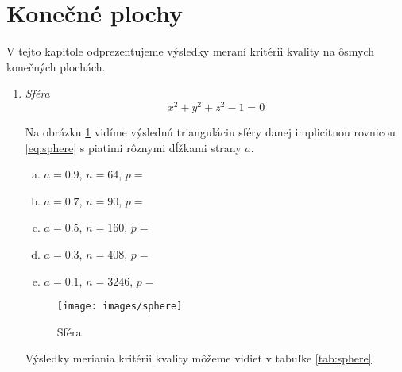 \section{Konečné plochy}

V tejto kapitole odprezentujeme výsledky meraní kritérii kvality na ôsmych konečných plochách.

\newpage

\begin{enumerate}
\item{
    \textit{Sféra}
    \begin{equation}
    \label{eq:sphere}
    x^2 + y^2 + z^2 - 1 = 0
    \end{equation}

    Na obrázku \ref{obr:sphere} vidíme výslednú trianguláciu sféry danej implicitnou 
    rovnicou \ref{eq:sphere} s piatimi rôznymi dĺžkami strany $a$.
    \begin{enumerate}[a)]
    \item{
        $a=0.9$, $n=64$, $p=$
    }
    \item{
        $a=0.7$, $n=90$, $p=$
    }
    \item{
        $a=0.5$, $n=160$, $p=$
    }
    \item{
        $a=0.3$, $n=408$, $p=$
    }
    \item{
        $a=0.1$, $n=3246$, $p=$
    }
    \end{enumerate}

    \begin{figure}
        \centerline{\texttt{[image: images/sphere]}}
        \caption[Sféra]{Sféra}
        \label{obr:sphere}
    \end{figure}

    Výsledky meriania kritérii kvality môžeme vidieť v tabuľke \ref{tab:sphere}.
    
}
\end{enumerate}
